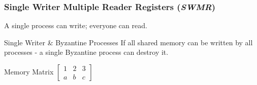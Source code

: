 \documentclass{beamer}
\begin{document}
\begin{frame}
    \frametitle{Single Writer Multiple Reader Registers (\emph{SWMR})}
    A single process can write; everyone can read.\\
    \begin{block}{Single Writer \& Byzantine Processes}
        If all shared memory can be written by all processes - a single Byzantine process can destroy it.
    \end{block}
    \begin{block}{Memory Matrix}
        $\begin{bmatrix}
            1 & 2 & 3\\
            a & b & c
        \end{bmatrix}$
    \end{block}
\end{frame}
\end{document}
